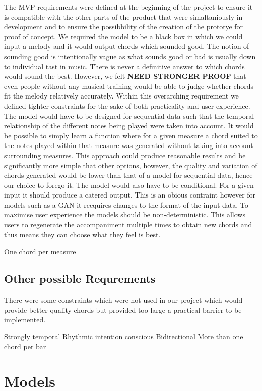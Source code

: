 The MVP requirements were defined at the beginning of the project to ensure it is compatible with the other parts of the product that were simaltaniously in development and to ensure the possibbility of the creation of the prototye for proof of concept. 
We required the model to be a black box in which we could input a melody and it would output chords which sounded good.
The notion of sounding good is intentionally vague as what sounds good or bad is usually down to individual tast in music.
There is never a definitive answer to which chords would sound the best.
However, we felt \textbf{NEED STRONGER PROOF} that even people without any musical training would be able to judge whether chords fit the melody relatively accurately.
Within this overarching requirement we defined tighter constraints for the sake of both practicality and user experience. 
The model would have to be designed for sequential data such that the temporal relationship of the different notes being played were taken into account.
It would be possible to simply learn a function where for a given measure a chord suited to the notes played within that measure was generated without taking into account surrounding measures.
This approach could produce reasonable results and be significantly more simple that other options, however, the quality and variation of chords generated would be lower than that of a model for sequential data, hence our choice to forego it.
The model would also have to be conditional. For a given input it should produce a catered output. This is an obious contraint however for models such as a GAN it recquires changes to the format of the input data.
To maximise user experience the models should be non-deterministic. This allows users to regenerate the accompaniment multiple times to obtain new chords and thus means they can choose what they feel is best.

One chord per measure
\subsection{Other possible Requrements}

There were some constraints which were not used in our project which would provide better quality chords but provided too large a practical barrier to be implemented.

Strongly temporal
Rhythmic intention conscious
Bidirectional
More than one chord per bar
\section{Models}



